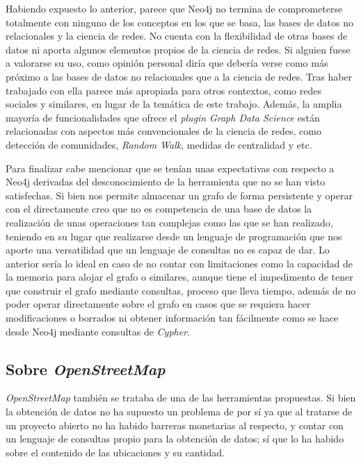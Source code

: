 Habiendo expuesto lo anterior, parece que Neo4j no termina de comprometerse totalmente con ninguno de los conceptos en los que se basa, las bases de datos no relacionales y la ciencia de redes. No cuenta con la flexibilidad de otras bases de datos ni aporta algunos elementos propios de la ciencia de redes. Si alguien fuese a valorarse su uso, como opinión personal diría que debería verse como más próximo a las bases de datos no relacionales que a la ciencia de redes. Tras haber trabajado con ella parece más apropiada para otros contextos, como redes sociales y similares, en lugar de la temática de este trabajo. Además, la amplia mayoría de funcionalidades que ofrece el \textit{plugin} \textit{Graph Data Science} están relacionadas con aspectos más convencionales de la ciencia de redes, como detección de comunidades, \textit{Random Walk}, medidas de centralidad y etc.

Para finalizar cabe mencionar que se tenían unas expectativas con respecto a Neo4j derivadas del desconocimiento de la herramienta que no se han visto satisfechas. Si bien nos permite almacenar un grafo de forma persistente y operar con el directamente creo que no es competencia de una base de datos la realización de unas operaciones tan complejas como las que se han realizado, teniendo en su lugar que realizarse desde un lenguaje de programación que nos aporte una versatilidad que un lenguaje de consultas no es capaz de dar. Lo anterior sería lo ideal en caso de no contar con limitaciones como la capacidad de la memoria para alojar el grafo o similares, aunque tiene el impedimento de tener que construir el grafo mediante consultas, proceso que lleva tiempo, además de no poder operar directamente sobre el grafo en casos que se requiera hacer modificaciones o borrados ni obtener información tan fácilmente como se hace desde Neo4j mediante consultas de \textit{Cypher}.



\subsection{Sobre \textit{OpenStreetMap}}

\textit{OpenStreetMap} también se trataba de una de las herramientas propuestas. Si bien la obtención de datos no ha supuesto un problema de por sí ya que al tratarse de un proyecto abierto no ha habido barreras monetarias al respecto, y contar con un lenguaje de consultas propio para la obtención de datos; sí que lo ha habido sobre el contenido de las ubicaciones y su cantidad.

